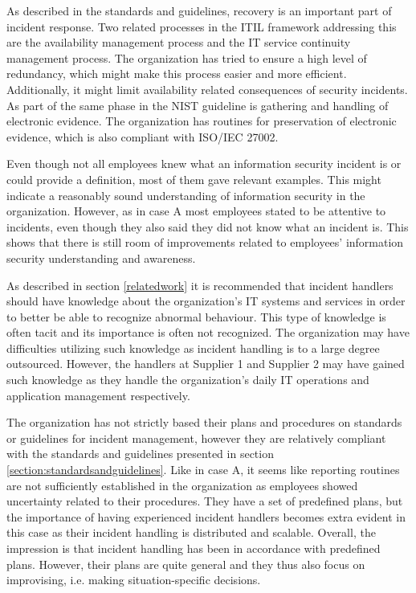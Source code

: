 As described in the standards and guidelines, recovery is an important part of incident response. Two related processes in the ITIL framework addressing this are the availability management process and the IT service continuity management process. The organization has tried to ensure a high level of redundancy, which might make this process easier and more efficient. Additionally, it might limit availability related consequences of security incidents. As part of the same phase in the NIST guideline is gathering and handling of electronic evidence. The organization has routines for preservation of electronic evidence, which is also compliant with ISO/IEC 27002.

Even though not all employees knew what an information security incident is or could provide a definition, most of them gave relevant examples. This might indicate a reasonably sound understanding of information security in the organization. However, as in case A most employees stated to be attentive to incidents, even though they also said they did not know what an incident is. This shows that there is still room of improvements related to employees' information security understanding and awareness.

As described in section \ref{relatedwork} it is recommended that incident handlers should have knowledge about the organization's IT systems and services in order to better be able to recognize abnormal behaviour. This type of knowledge is often tacit and its importance is often not recognized. The organization may have difficulties utilizing such knowledge as incident handling is to a large degree outsourced. However, the handlers at Supplier 1 and Supplier 2 may have gained such knowledge as they handle the organization's daily IT operations and application management respectively. %

The organization has not strictly based their plans and procedures on standards or guidelines for incident management, however they are relatively compliant with the standards and guidelines presented in section \ref{section:standardsandguidelines}. Like in case A, it seems like reporting routines are not sufficiently established in the organization as employees showed uncertainty related to their procedures. They have a set of predefined plans, but the importance of having experienced incident handlers becomes extra evident in this case as their incident handling is distributed and scalable. Overall, the impression is that incident handling has been in accordance with predefined plans. However, their plans are quite general and they thus also focus on improvising, i.e. making situation-specific decisions. 

